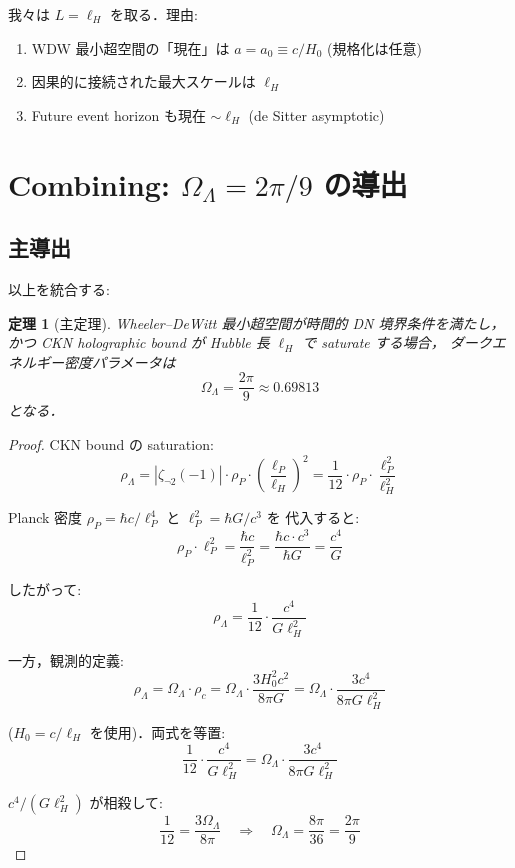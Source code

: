 \documentclass[11pt,a4paper]{article}
\newtheorem{theorem}{定理}
\begin{document}
我々は $L = \ell_H$ を取る．理由:
\begin{enumerate}
\item WDW 最小超空間の「現在」は $a = a_0 \equiv c/H_0$ (規格化は任意)
\item 因果的に接続された最大スケールは $\ell_H$
\item Future event horizon も現在 $\sim \ell_H$ (de Sitter asymptotic)
\end{enumerate}

\section{Combining: $\Omega_\Lambda = 2\pi/9$ の導出}

\subsection{主導出}

以上を統合する:

\begin{theorem}[主定理]
Wheeler--DeWitt 最小超空間が時間的 DN 境界条件を満たし，かつ
CKN holographic bound が Hubble 長 $\ell_H$ で saturate する場合，
ダークエネルギー密度パラメータは
\begin{equation}
\Omega_\Lambda = \frac{2\pi}{9} \approx 0.69813
\end{equation}
となる．
\end{theorem}

\begin{proof}
CKN bound の saturation:
\begin{equation}
\rho_\Lambda = |\zeta_{\neg 2}(-1)|\cdot\rho_P\cdot\left(\frac{\ell_P}{\ell_H}\right)^2
= \frac{1}{12}\cdot\rho_P\cdot\frac{\ell_P^2}{\ell_H^2}
\end{equation}

Planck 密度 $\rho_P = \hbar c / \ell_P^4$ と $\ell_P^2 = \hbar G/c^3$ を
代入すると:
\begin{equation}
\rho_P\cdot\ell_P^2 = \frac{\hbar c}{\ell_P^2} = \frac{\hbar c \cdot c^3}{\hbar G}
= \frac{c^4}{G}
\end{equation}

したがって:
\begin{equation}
\rho_\Lambda = \frac{1}{12}\cdot\frac{c^4}{G\ell_H^2}
\end{equation}

一方，観測的定義:
\begin{equation}
\rho_\Lambda = \Omega_\Lambda\cdot\rho_c = \Omega_\Lambda\cdot\frac{3 H_0^2 c^2}{8\pi G}
= \Omega_\Lambda\cdot\frac{3 c^4}{8\pi G \ell_H^2}
\end{equation}

($H_0 = c/\ell_H$ を使用)．両式を等置:
\begin{equation}
\frac{1}{12}\cdot\frac{c^4}{G\ell_H^2} = \Omega_\Lambda\cdot\frac{3c^4}{8\pi G \ell_H^2}
\end{equation}

$c^4/(G\ell_H^2)$ が相殺して:
\begin{equation}
\frac{1}{12} = \frac{3\Omega_\Lambda}{8\pi}\quad\Longrightarrow\quad
\Omega_\Lambda = \frac{8\pi}{36} = \frac{2\pi}{9}
\end{equation}
\end{proof}
\end{document}
